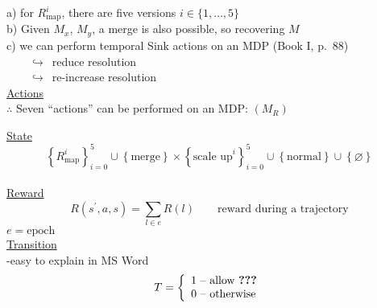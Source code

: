 a) for $R^{i}_{\textrm{map}}$, there are five versions $i\in\{1,\ldots,5\}$\\
b) Given $M_x$, $M_y$, a merge is also possible, so recovering $M$\\
c) we can perform temporal Sink actions on an MDP (Book I, p.\ 88)\\
${}\qquad\hookrightarrow$\ reduce resolution\\
${}\qquad\hookrightarrow$\ re-increase resolution\\

\underline{Actions}\\

$\therefore$ Seven ``actions'' can be performed on an MDP: $(M_R)$\\

$\qquad$\begin{minipage}[t]{0.9\textwidth}
\underline{State}\\

\begin{equation*}
\left\{R^i_{\textrm{map}}\right\}_{i=0}^{5}\cup \left\{\text{merge}\right\}\times\left\{\text{scale\ up}^{i}\right\}_{i=0}^{5}\cup\left\{\text{normal}\right\}\cup\left\{\varnothing\right\}
\end{equation*}\\

\underline{Reward}\\

\begin{equation*}
R(s^\prime,a,s)=\sum_{l\in e}R(l)\qquad\text{reward during a trajectory}
\end{equation*}
$e=\text{epoch}$\\

\underline{Transition}\\

-easy to explain in MS Word
\begin{equation*}
T=\left\{
\begin{array}{l}
1\ \text{-- allow \textbf{???}}\\
0\ \text{-- otherwise}
\end{array}
\right.
\end{equation*}
\end{minipage}

